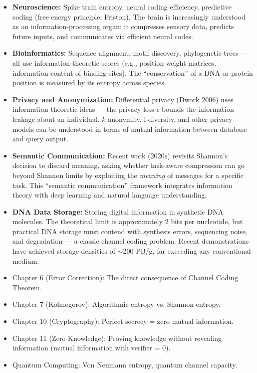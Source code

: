 \begin{itemize}
\item \textbf{Neuroscience:} Spike train entropy, neural coding efficiency, predictive coding (free energy principle, Friston). The brain is increasingly understood as an information-processing organ: it compresses sensory data, predicts future inputs, and communicates via efficient neural codes.

\item \textbf{Bioinformatics:} Sequence alignment, motif discovery, phylogenetic trees — all use information-theoretic scores (e.g., position-weight matrices, information content of binding sites). The ``conservation'' of a DNA or protein position is measured by its entropy across species.

\item \textbf{Privacy and Anonymization:} Differential privacy (Dwork 2006) uses information-theoretic ideas — the privacy loss $\epsilon$ bounds the information leakage about an individual. $k$-anonymity, l-diversity, and other privacy models can be understood in terms of mutual information between database and query output.

\item \textbf{Semantic Communication:} Recent work (2020s) revisits Shannon's decision to discard meaning, asking whether task-aware compression can go beyond Shannon limits by exploiting the \emph{meaning} of messages for a specific task. This ``semantic communication'' framework integrates information theory with deep learning and natural language understanding.

\item \textbf{DNA Data Storage:} Storing digital information in synthetic DNA molecules. The theoretical limit is approximately 2 bits per nucleotide, but practical DNA storage must contend with synthesis errors, sequencing noise, and degradation — a classic channel coding problem. Recent demonstrations have achieved storage densities of $\sim$200 PB/g, far exceeding any conventional medium.

\end{itemize}

\begin{itemize}
\item Chapter 6 (Error Correction): The direct consequence of Channel Coding Theorem.
\item Chapter 7 (Kolmogorov): Algorithmic entropy vs. Shannon entropy.
\item Chapter 10 (Cryptography): Perfect secrecy = zero mutual information.
\item Chapter 11 (Zero Knowledge): Proving knowledge without revealing information (mutual information with verifier = 0).
\item Quantum Computing: Von Neumann entropy, quantum channel capacity.
\end{itemize}

